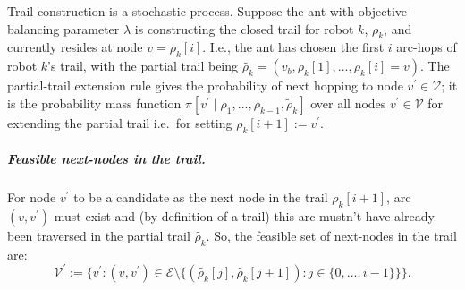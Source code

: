 \documentclass[11pt, oneside]{article}
\begin{document}
Trail construction is a stochastic process. Suppose the ant with objective-balancing parameter $\lambda$ is constructing the closed trail for robot $k$, $\rho_k$, and currently resides at node $v=\rho_k[i]$.
I.e., the ant has chosen the first $i$ arc-hops of robot $k$'s trail, with the partial trail being $\tilde{\rho_k}=(v_b, \rho_k[1], ..., \rho_k[i]=v)$.
The partial-trail extension rule gives the probability of next hopping to node $v^\prime\in\mathcal{V}$; it is the probability mass function $\pi[v^\prime \mid \rho_1, ..., \rho_{k-1}, \tilde{\rho}_k]$ over all nodes $v^\prime \in \mathcal{V}$ for extending the partial trail i.e.\ for setting $\rho_k[i+1]:=v^\prime$.

\subparagraph{Feasible next-nodes in the trail.}
For node $v^\prime$ to be a candidate as the next node in the trail $\rho_k[i+1]$, arc $(v, v^\prime)$ must exist and (by definition of a trail) this arc mustn't have already been traversed in the partial trail $\tilde{\rho_k}$. 
So, the feasible set of next-nodes in the trail are:
\begin{equation}
 	\mathcal{V}^\prime := \{ v^\prime : (v, v^\prime ) \in \mathcal{E} \setminus \{ (\tilde{\rho_k}[j], \tilde{\rho_k}[j+1]) : j \in \{0,...,i-1\} \}\}.
\end{equation}

\end{document}
